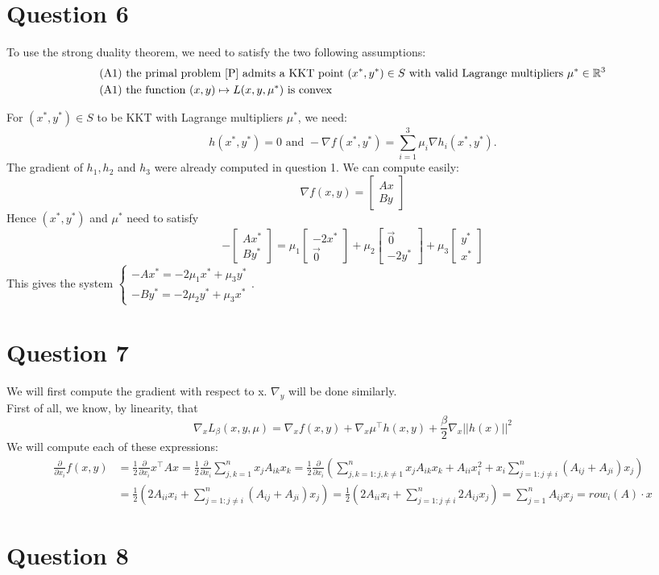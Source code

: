 \documentclass{article}
\newcommand{\R}{\mathbb{R}}
\newcommand{\p}{\frac{\partial}{\partial x_i}}
\begin{document}
\section*{Question 6}
To use the strong duality theorem, we need to satisfy the two following assumptions:
\begin{align*}
(\text{A}1) &  \text{ the primal problem \eqref{P} admits a KKT point } (x^*,y^*)\in S \text{ with valid Lagrange multipliers } \mu^*\in \R^3 \\
(\text{A}1) &  \text{ the function } (x,y)\mapsto L(x,y,\mu^*) \text{ is convex}
\end{align*}

\noindent For $ (x^*,y^*)\in S$ to be KKT with Lagrange multipliers $\mu^*$, we need: $$h(x^*,y^*)=0 \text{ and }-\nabla f(x^*,y^*)=\sum_{i=1}^3\mu_i\nabla h_i (x^*,y^*).$$
The gradient of $h_1,h_2$ and $h_3$ were already computed in question 1. We can compute easily:
$$\nabla f(x,y) =\begin{bmatrix}
Ax \\ By
\end{bmatrix}$$
Hence $(x^*,y^*)$ and $\mu^*$ need to satisfy
$$-\begin{bmatrix}Ax^* \\ By^*\end{bmatrix}
= \mu_1 \begin{bmatrix} -2x^*\\ \vec 0 \end{bmatrix} + \mu_2 \begin{bmatrix} \vec 0\\ -2y^* \end{bmatrix}+\mu_3 \begin{bmatrix} y^*\\ x^* \end{bmatrix}
$$
This gives the system $\begin{cases} -Ax^* = -2\mu_1 x^* +\mu_3 y^* \\
-By^* = -2\mu_2 y^* +\mu_3 x^*\end{cases}.$

\section*{Question 7}

We will first compute the gradient with respect to x. $\nabla_y$ will be done similarly.\\
First of all, we know, by linearity, that 
$$\nabla_x L_{\beta}(x,y,\mu)=\nabla_x f(x,y) + \nabla_x \mu^\top h(x,y)+ \frac{\beta}{2} \nabla_x ||h(x)||^2$$
We will compute each of these expressions:\\
\begin{align*}
\p f(x,y)&=\frac{1}{2} \p x^\top A x=\frac{1}{2} \p \sum_{j,k=1}^n x_j A_{ik} x_k=\frac{1}{2} \p \left( \sum_{j,k=1 : j,k\neq1}^n x_j A_{ik} x_k+A_{ii}x_i^2+ x_i \sum_{j=1 : j\neq i}^n (A_{ij}+A_{ji})x_j \right)\\
&=\frac{1}{2}\left( 2 A_{ii} x_i +  \sum_{j=1 : j\neq i}^n (A_{ij}+A_{ji})x_j \right)=\frac{1}{2}\left( 2 A_{ii} x_i +  \sum_{j=1 : j\neq i}^n 2 A_{ij}x_j \right)= \sum_{j=1}^n  A_{ij}x_j =row_i (A) \cdot x
\end{align*}

\section*{Question 8}
\end{document}
